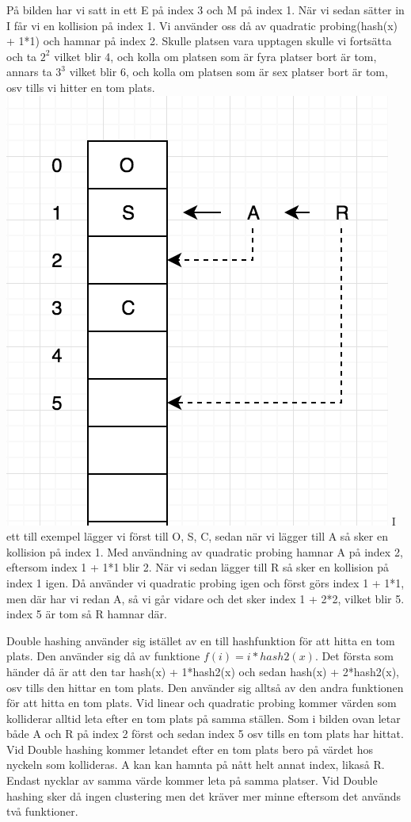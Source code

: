 \documentclass[a5paper,10pt,oneside]{article}
\begin{document}
 På bilden har vi satt in ett E på index 3 och M på index 1. När vi sedan sätter in I får vi en kollision på index 1. Vi använder oss då av quadratic probing(hash(x) + 1*1) och hamnar på index 2. Skulle platsen vara upptagen skulle vi fortsätta och ta $2^2$ vilket blir 4, och kolla om platsen som är fyra platser bort är tom, annars ta $3^3$ vilket blir 6, och kolla om platsen som är sex platser bort är tom, osv tills vi hitter en tom plats.
\includegraphics[scale=1]{quad}
I ett till exempel lägger vi först till O, S, C, sedan när vi lägger till A så sker en kollision på index 1. Med användning av quadratic probing hamnar A på index 2, eftersom index 1 + 1*1 blir 2. När vi sedan lägger till R så sker en kollision på index 1 igen. Då använder vi quadratic probing igen och först görs index 1 + 1*1, men där har vi redan A, så vi går vidare och det sker index 1 + 2*2, vilket blir 5. index 5 är tom så R hamnar där.

Double hashing använder sig istället av en till hashfunktion för att hitta en tom plats. Den använder sig då av funktione $f(i) =  i*hash2(x)$. Det första som händer då är att den tar hash(x) + 1*hash2(x) och sedan hash(x) + 2*hash2(x), osv tills den hittar en tom plats. Den använder sig alltså av den andra funktionen för att hitta en tom plats. Vid linear och quadratic probing kommer värden som kolliderar alltid leta efter en tom plats på samma ställen. Som i bilden ovan letar både A och R på index 2 först och sedan index 5 osv tills en tom plats har hittat. Vid Double hashing kommer letandet efter en tom plats bero på värdet hos nyckeln som kollideras. A kan kan hamnta på nått helt annat index, likaså R. Endast nycklar av samma värde kommer leta på samma platser. Vid Double hashing sker då ingen clustering men det kräver mer minne eftersom det används två funktioner.
\end{document}
